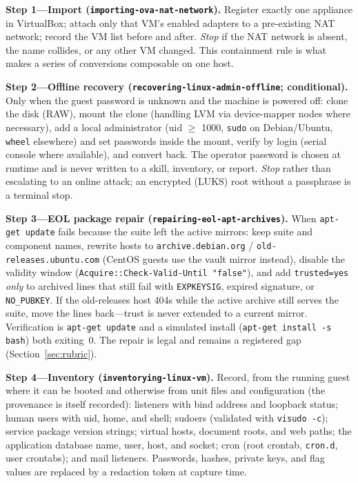 \documentclass[3p,twocolumn,authoryear]{elsarticle}
\begin{document}
\textbf{Step 1---Import (\texttt{importing-\allowbreak ova-\allowbreak nat-\allowbreak network}).} Register
exactly one appliance in VirtualBox; attach only that VM's enabled
adapters to a pre-existing NAT network; record the VM list before and
after. \emph{Stop} if the NAT network is absent, the name collides, or
any other VM changed. This containment rule is what makes a series of
conversions composable on one host.

\textbf{Step 2---Offline recovery
(\texttt{recovering-\allowbreak linux-\allowbreak admin-\allowbreak offline}; conditional).} Only when the
guest password is unknown and the machine is powered off: clone the
disk (RAW), mount the clone (handling LVM via device-mapper nodes where
necessary), add a local administrator (uid $\geq$ 1000, \texttt{sudo} on
Debian/Ubuntu, \texttt{wheel} elsewhere) and set passwords inside the
mount, verify by login (serial console where available), and convert
back. The operator password is chosen at runtime and is never written
to a skill, inventory, or report. \emph{Stop} rather than escalating to
an online attack; an encrypted (LUKS) root without a passphrase is a
terminal stop.

\textbf{Step 3---EOL package repair
(\texttt{repairing-\allowbreak eol-\allowbreak apt-\allowbreak archives}).} When \texttt{apt-get update}
fails because the suite left the active mirrors: keep suite and
component names, rewrite hosts to \texttt{archive.debian.org} /
\texttt{old-releases.ubuntu.com} (CentOS guests use the vault mirror
instead), disable the validity window
(\texttt{Acquire::Check-Valid-Until "false"}), and add
\texttt{trusted=yes} \emph{only} to archived lines that still fail with
\texttt{EXPKEYSIG}, expired signature, or \texttt{NO\_PUBKEY}. If the
old-releases host 404s while the active archive still serves the suite,
move the lines back---trust is never extended to a current mirror.
Verification is \texttt{apt-get update} and a simulated install
(\texttt{apt-get install -s bash}) both exiting~0. The repair is legal
and remains a registered gap (Section~\ref{sec:rubric}).

\textbf{Step 4---Inventory (\texttt{inventorying-\allowbreak linux-\allowbreak vm}).} Record,
from the running guest where it can be booted and otherwise from unit
files and configuration (the provenance is itself recorded): listeners
with bind address and loopback status; human users with uid, home, and
shell; sudoers (validated with \texttt{visudo -c}); service package
version strings; virtual hosts, document roots, and web paths; the
application database name, user, host, and socket; cron (root crontab,
\texttt{cron.d}, user crontabs); and mail listeners. Passwords, hashes,
private keys, and flag values are replaced by a redaction token at
capture time.
\end{document}
